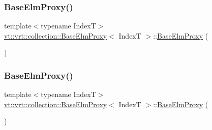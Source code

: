 \mbox{\label{structvt_1_1vrt_1_1collection_1_1_base_elm_proxy_acdf49c12d1ec8e9afc2976e9cac2c85d}} 
\subsubsection{\texorpdfstring{Base\+Elm\+Proxy()}{BaseElmProxy()}\hspace{0.1cm}{\footnotesize\ttfamily [4/5]}}
{\footnotesize\ttfamily template$<$typename IndexT$>$ \\
\hyperlink{structvt_1_1vrt_1_1collection_1_1_base_elm_proxy}{vt\+::vrt\+::collection\+::\+Base\+Elm\+Proxy}$<$ IndexT $>$\+::\hyperlink{structvt_1_1vrt_1_1collection_1_1_base_elm_proxy}{Base\+Elm\+Proxy} (\begin{DoxyParamCaption}\item[{\hyperlink{structvt_1_1vrt_1_1collection_1_1_base_elm_proxy}{Base\+Elm\+Proxy}$<$ IndexT $>$ const \&}]{ }\end{DoxyParamCaption})\hspace{0.3cm}{\ttfamily [default]}}

\mbox{\label{structvt_1_1vrt_1_1collection_1_1_base_elm_proxy_a0e44bb4f28bacdb38c850fb949009fc3}} 
\subsubsection{\texorpdfstring{Base\+Elm\+Proxy()}{BaseElmProxy()}\hspace{0.1cm}{\footnotesize\ttfamily [5/5]}}
{\footnotesize\ttfamily template$<$typename IndexT$>$ \\
\hyperlink{structvt_1_1vrt_1_1collection_1_1_base_elm_proxy}{vt\+::vrt\+::collection\+::\+Base\+Elm\+Proxy}$<$ IndexT $>$\+::\hyperlink{structvt_1_1vrt_1_1collection_1_1_base_elm_proxy}{Base\+Elm\+Proxy} (\begin{DoxyParamCaption}\item[{\hyperlink{structvt_1_1vrt_1_1collection_1_1_base_elm_proxy}{Base\+Elm\+Proxy}$<$ IndexT $>$ \&\&}]{ }\end{DoxyParamCaption})\hspace{0.3cm}{\ttfamily [default]}}




